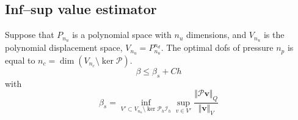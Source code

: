 \subsection{Inf--sup value estimator}


\begin{thm}
    Suppose that $P_{n_u}$ is a polynomial space with $n_u$ dimensions, and $V_{n_u}$ is the polynomial displacement space, $V_{n_u} = P_{n_u}^{n_d}$. The optimal dofs of pressure $n_p$ is equal to $n_c = \dim(V_{n_c}\setminus \ker \mathcal P)$.
    \begin{equation}\label{estimator}
        \beta \le \beta_s + Ch 
    \end{equation}
    with
    \begin{equation}\label{beta_s}
        \beta_s = 
        \inf_{V' \subset V_{n_u} \setminus \ker \mathcal P_h \mathcal I_h} \sup_{v \in V'} \frac{\Vert \mathcal P \boldsymbol v \Vert_Q}{\Vert \boldsymbol v \Vert_V}
    \end{equation}
\end{thm}
